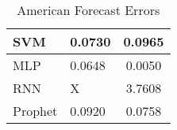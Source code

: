 \documentclass{beamer}
\begin{document}
\begin{frame}
\begin{table}
{\begin{tabular}{|lll|}
					\multicolumn{1}{|l|}{SVM}     & \multicolumn{1}{l|}{0.0730}       & \multicolumn{1}{c|}{0.0965}  \\ \hline
					\multicolumn{1}{|l|}{MLP}     & \multicolumn{1}{l|}{0.0648}       & \multicolumn{1}{c|}{0.0050}  \\ \hline
					\multicolumn{1}{|l|}{RNN}     & \multicolumn{1}{l|}{X}       & \multicolumn{1}{c|}{3.7608}  \\ \hline
					\multicolumn{1}{|l|}{Prophet} & \multicolumn{1}{l|}{0.0920}       & \multicolumn{1}{c|}{0.0758}  \\ \hline
				\end{tabular}
				\caption{American Forecast Errors}
			}
		\end{table}
		
	\end{frame}
\end{document}
